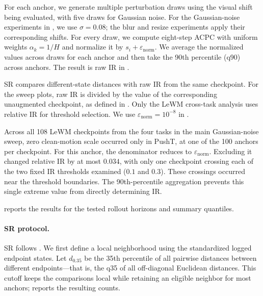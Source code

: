 For each anchor, we generate multiple perturbation draws using the visual
shift being evaluated, with five draws for Gaussian noise. For the Gaussian-noise
experiments in , we use $\sigma=0.08$; the
blur and resize experiments apply their corresponding shifts. For every draw,
we compute eight-step ACPC with uniform weights $\alpha_k=1/H$ and normalize it
by $s_i+\varepsilon_{\mathrm{norm}}$. We average the normalized values across
draws for each anchor and then take the 90th percentile (q90) across anchors.
The result is raw IR in
.

SR compares different-state distances with raw IR from the same checkpoint.
For the sweep plots, raw IR is divided by the value of the corresponding
unaugmented checkpoint, as defined in . Only the LeWM
cross-task analysis uses relative IR for threshold selection. We use
$\varepsilon_{\mathrm{norm}}=10^{-8}$ in
.

Across all 108 LeWM checkpoints from the four tasks in the main Gaussian-noise
sweep, zero clean-motion scale occurred only in PushT, at one of the 100
anchors per checkpoint. For this anchor, the denominator reduces to
$\varepsilon_{\mathrm{norm}}$. Excluding it changed relative IR by at most
$0.034$, with only one checkpoint crossing each of the two fixed IR thresholds
examined ($0.1$ and $0.3$). These crossings occurred near the threshold
boundaries. The 90th-percentile aggregation prevents this single extreme value
from directly determining IR.

 reports the results for the tested
rollout horizons and summary quantiles.



\paragraph{SR protocol.}
SR follows . We first define a local neighborhood using the
standardized logged endpoint states. Let $d_{0.35}$ be the 35th percentile of
all pairwise distances between different endpoints---that is, the q35 of all off-diagonal Euclidean distances.
This cutoff keeps the comparisons local while retaining an eligible neighbor for most anchors;
 reports the resulting counts.

